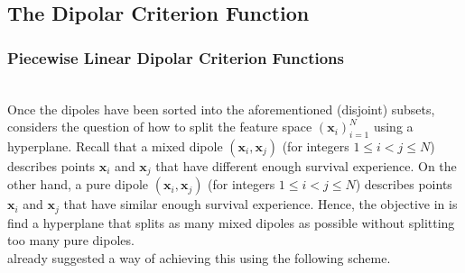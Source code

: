 \documentclass[12pt]{amsart}
\theoremstyle{definition}
\theoremstyle{plain}
\theoremstyle{remark}
\begin{document}
\subsection{The Dipolar Criterion Function}


\subsubsection{Piecewise Linear Dipolar Criterion Functions} \hfill \\


Once the dipoles have been sorted into the aforementioned (disjoint) subsets, \cite{kretowska} considers the question of how to split the feature space $(\mathbf{x}_i)_{i = 1}^N$ using a hyperplane. Recall that a mixed dipole $(\mathbf{x}_i, \mathbf{x}_j)$ (for integers $1 \leq i < j \leq N$) describes points $\mathbf{x}_i$ and $\mathbf{x}_j$ that have different enough survival experience. On the other hand, a pure dipole $(\mathbf{x}_i, \mathbf{x}_j)$ (for integers $1 \leq i < j \leq N$) describes points $\mathbf{x}_i$ and $\mathbf{x}_j$ that have similar enough survival experience. Hence, the objective in \cite{kretowska} is find a hyperplane that splits as many mixed dipoles as possible without splitting too many pure dipoles. \\

\cite{kretowska} already suggested a way of achieving this using the following scheme.
\end{document}
